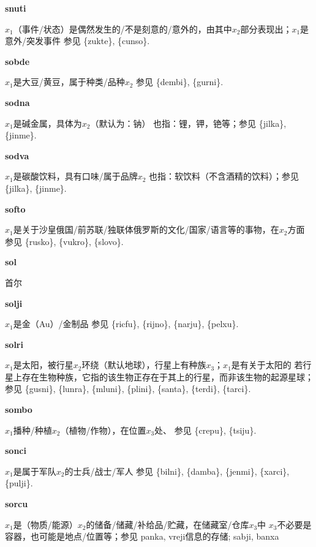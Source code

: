 \documentclass[notitlepage,twocolumn,a4paper,10pt]{book}
\begin{document}
{\sffamily\bfseries snuti}\enspace {\ttfamily\bfseries[nut]}  $x_1$（事件\slash{}状态）是偶然发生的\slash{}不是刻意的\slash{}意外的，由其中$x_2$部分表现出；$x_1$是意外\slash{}突发事件 \textemdash{} 参见 \{zukte\}, \{cunso\}.

{\sffamily\bfseries sobde}\enspace {\ttfamily\bfseries[sob     so'e]}  $x_1$是大豆\slash{}黄豆，属于种类\slash{}品种$x_2$ \textemdash{} 参见 \{dembi\}, \{gurni\}.

{\sffamily\bfseries sodna} $x_1$是碱金属，具体为$x_2$（默认为：钠） \textemdash{} 也指：锂，钾，铯等；参见 \{jilka\}, \{jinme\}.

{\sffamily\bfseries sodva}\enspace {\ttfamily\bfseries[sod]}  $x_1$是碳酸饮料，具有口味\slash{}属于品牌$x_2$ \textemdash{} 也指：软饮料（不含酒精的饮料）；参见 \{jilka\}, \{jinme\}.

{\sffamily\bfseries softo}\enspace {\ttfamily\bfseries[sof]}  $x_1$是关于沙皇俄国\slash{}前苏联\slash{}独联体俄罗斯的文化\slash{}国家\slash{}语言等的事物，在$x_2$方面 \textemdash{} 参见 \{rusko\}, \{vukro\}, \{slovo\}.

{\sffamily\bfseries sol} 首尔

{\sffamily\bfseries solji}\enspace {\ttfamily\bfseries[    slo]}  $x_1$是金（Au）\slash{}金制品 \textemdash{} 参见 \{ricfu\}, \{rijno\}, \{narju\}, \{pelxu\}.

{\sffamily\bfseries solri}\enspace {\ttfamily\bfseries[sol]}  $x_1$是太阳，被行星$x_2$环绕（默认地球），行星上有种族$x_3$；$x_1$是有关于太阳的 \textemdash{} 若行星上存在生物种族，它指的该生物正存在于其上的行星，而非该生物的起源星球；参见 \{gusni\}, \{lunra\}, \{mluni\}, \{plini\}, \{santa\}, \{terdi\}, \{tarci\}.

{\sffamily\bfseries sombo}\enspace {\ttfamily\bfseries[som     so'o]}  $x_1$播种\slash{}种植$x_2$（植物\slash{}作物），在位置$x_3$处、 \textemdash{} 参见 \{crepu\}, \{tsiju\}.

{\sffamily\bfseries sonci}  $x_1$是属于军队$x_2$的士兵\slash{}战士\slash{}军人 \textemdash{} 参见 \{bilni\}, \{damba\}, \{jenmi\}, \{xarci\}, \{pulji\}.

{\sffamily\bfseries sorcu}  $x_1$是（物质\slash{}能源）$x_2$的储备\slash{}储藏\slash{}补给品\slash{}贮藏，在储藏室\slash{}仓库$x_3$中 \textemdash{} $x_3$不必要是容器，也可能是地点\slash{}位置等；参见 {panka}, {vreji}信息的存储; {sabji}, {banxa}
\end{document}
